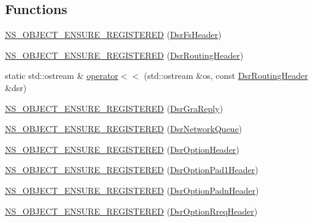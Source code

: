 \subsection*{Functions}
\begin{DoxyCompactItemize}
\item 
\hyperlink{namespacens3_1_1dsr_a3305a32b01d40c03c1525879a240b729}{N\+S\+\_\+\+O\+B\+J\+E\+C\+T\+\_\+\+E\+N\+S\+U\+R\+E\+\_\+\+R\+E\+G\+I\+S\+T\+E\+R\+ED} (\hyperlink{classns3_1_1dsr_1_1DsrFsHeader}{Dsr\+Fs\+Header})
\item 
\hyperlink{namespacens3_1_1dsr_afc19d82d7603a8860867f6948fba7767}{N\+S\+\_\+\+O\+B\+J\+E\+C\+T\+\_\+\+E\+N\+S\+U\+R\+E\+\_\+\+R\+E\+G\+I\+S\+T\+E\+R\+ED} (\hyperlink{classns3_1_1dsr_1_1DsrRoutingHeader}{Dsr\+Routing\+Header})
\item 
static std\+::ostream \& \hyperlink{namespacens3_1_1dsr_a9dc67ae39788a83ff6e893c58e91d336}{operator$<$$<$} (std\+::ostream \&os, const \hyperlink{classns3_1_1dsr_1_1DsrRoutingHeader}{Dsr\+Routing\+Header} \&dsr)
\item 
\hyperlink{namespacens3_1_1dsr_a175f8ac8b9433513f377d9d163bd1d1b}{N\+S\+\_\+\+O\+B\+J\+E\+C\+T\+\_\+\+E\+N\+S\+U\+R\+E\+\_\+\+R\+E\+G\+I\+S\+T\+E\+R\+ED} (\hyperlink{classns3_1_1dsr_1_1DsrGraReply}{Dsr\+Gra\+Reply})
\item 
\hyperlink{namespacens3_1_1dsr_a05009448da60a64acc7775d1b4fe3257}{N\+S\+\_\+\+O\+B\+J\+E\+C\+T\+\_\+\+E\+N\+S\+U\+R\+E\+\_\+\+R\+E\+G\+I\+S\+T\+E\+R\+ED} (\hyperlink{classns3_1_1dsr_1_1DsrNetworkQueue}{Dsr\+Network\+Queue})
\item 
\hyperlink{namespacens3_1_1dsr_a5cc989f7e0e6ec5eefc4748427082ecb}{N\+S\+\_\+\+O\+B\+J\+E\+C\+T\+\_\+\+E\+N\+S\+U\+R\+E\+\_\+\+R\+E\+G\+I\+S\+T\+E\+R\+ED} (\hyperlink{classns3_1_1dsr_1_1DsrOptionHeader}{Dsr\+Option\+Header})
\item 
\hyperlink{namespacens3_1_1dsr_af6ebc1cf619ef4aee0933427f00714dc}{N\+S\+\_\+\+O\+B\+J\+E\+C\+T\+\_\+\+E\+N\+S\+U\+R\+E\+\_\+\+R\+E\+G\+I\+S\+T\+E\+R\+ED} (\hyperlink{classns3_1_1dsr_1_1DsrOptionPad1Header}{Dsr\+Option\+Pad1\+Header})
\item 
\hyperlink{namespacens3_1_1dsr_a77bf292cc2f86583ece59fcf8952a8d7}{N\+S\+\_\+\+O\+B\+J\+E\+C\+T\+\_\+\+E\+N\+S\+U\+R\+E\+\_\+\+R\+E\+G\+I\+S\+T\+E\+R\+ED} (\hyperlink{classns3_1_1dsr_1_1DsrOptionPadnHeader}{Dsr\+Option\+Padn\+Header})
\item 
\hyperlink{namespacens3_1_1dsr_a61b9c32ae15c65914ff0ad5971a86e7b}{N\+S\+\_\+\+O\+B\+J\+E\+C\+T\+\_\+\+E\+N\+S\+U\+R\+E\+\_\+\+R\+E\+G\+I\+S\+T\+E\+R\+ED} (\hyperlink{classns3_1_1dsr_1_1DsrOptionRreqHeader}{Dsr\+Option\+Rreq\+Header})

\end{DoxyCompactItemize}
